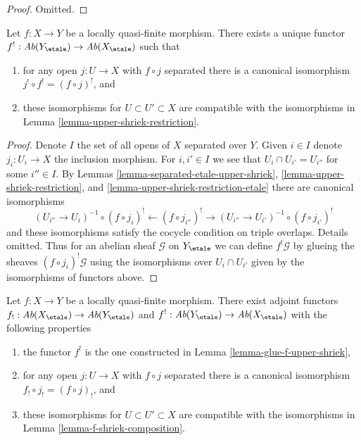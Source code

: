 \begin{proof}
Omitted.
\end{proof}

\begin{lemma}
\label{lemma-glue-f-upper-shriek}
Let $f : X \to Y$ be a locally quasi-finite morphism. There exists a unique
functor $f^! : \textit{Ab}(Y_\etale) \to \textit{Ab}(X_\etale)$ such that
\begin{enumerate}
\item for any open $j : U \to X$ with $f \circ j$ separated there
is a canonical isomorphism $j^! \circ f^! = (f \circ j)^!$, and
\item these isomorphisms for $U \subset U' \subset X$ are compatible
with the isomorphisms in
Lemma \ref{lemma-upper-shriek-restriction}.
\end{enumerate}
\end{lemma}

\begin{proof}
Denote $I$ the set of all opens of $X$ separated over $Y$.
Given $i \in I$ denote $j_i : U_i \to X$ the inclusion morphism.
For $i, i' \in I$ we see that $U_i \cap U_{i'} = U_{i''}$ for some $i'' \in I$.
By Lemmas \ref{lemma-separated-etale-upper-shriek},
\ref{lemma-upper-shriek-restriction}, and
\ref{lemma-upper-shriek-restriction-etale}
there are canonical isomorphisms
$$
(U_{i''} \to U_i)^{-1} \circ (f \circ j_i)^!
\longleftarrow
(f \circ j_{i''})^!
\longrightarrow
(U_{i''} \to U_{i'})^{-1} \circ (f \circ j_{i'})^!
$$
and these isomorphisms satisfy the cocycle condition on triple
overlaps. Details omitted.
Thus for an abelian sheaf $\mathcal{G}$ on $Y_\etale$ we can
define $f^!\mathcal{G}$ by glueing the sheaves
$(f \circ j_i)^!\mathcal{G}$ using the isomorphisms over
$U_i \cap U_{i'}$ given by the isomorphisms of functors above.
\end{proof}

\begin{proposition}
\label{proposition-lqf-shriek}
Let $f : X \to Y$ be a locally quasi-finite morphism. There exist
adjoint functors $f_! : \textit{Ab}(X_\etale) \to \textit{Ab}(Y_\etale)$
and $f^! : \textit{Ab}(Y_\etale) \to \textit{Ab}(X_\etale)$
with the following properties
\begin{enumerate}
\item the functor $f^!$ is the one constructed in
Lemma \ref{lemma-glue-f-upper-shriek},
\item for any open $j : U \to X$ with $f \circ j$ separated
there is a canonical isomorphism $f_! \circ j_! = (f \circ j)_!$, and
\item these isomorphisms for $U \subset U' \subset X$ are compatible
with the isomorphisms in Lemma \ref{lemma-f-shriek-composition}.
\end{enumerate}
\end{proposition}

